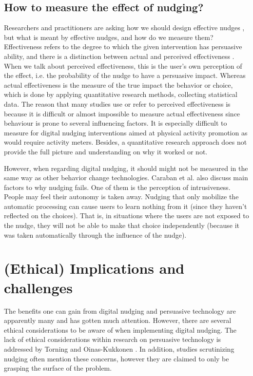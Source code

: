 \subsection{How to measure the effect of nudging?}
Researchers and practitioners are asking how we should design effective nudges 
\cite{purohit_functional_2019},
but what is meant by effective nudges, and how do we measure them? Effectiveness refers to the degree to which the given intervention has persuasive ability, and there is a distinction between actual and perceived effectiveness 
\cite{dillard_relationship_2007}.
When we talk about perceived effectiveness, this is the user's own perception of the effect, i.e. the probability of the nudge to have a persuasive impact. Whereas actual effectiveness is the measure of the true impact the behavior or choice, which is done by applying quantitative research methods, collecting statistical data. The reason that many studies use or refer to perceived effectiveness is because it is difficult or almost impossible to measure actual effectiveness since behaviour is prone to several influencing factors. It is especially difficult to measure for digital nudging interventions aimed at physical activity promotion as would require activity meters. Besides, a quantitative research approach does not provide the full picture and understanding on why it worked or not. 

However, when regarding digital nudging, it should might not be measured in the same way as other behavior change technologies. Caraban et al. also discuss main factors to why nudging fails. One of them is the perception of intrusiveness. People may feel their autonomy is taken away. Nudging that only mobilize the automatic processing can cause users to learn nothing from it (since they haven't reflected on the choices). That is, in situations where the users are not exposed to the nudge, they will not be able to make that choice independently (because it was taken automatically through the influence of the nudge). 

\section{(Ethical) Implications and challenges}
The benefits one can gain from digital nudging and persuasive technology are apparently many and has gotten much attention. However, there are several ethical considerations to be aware of when implementing digital nudging. The lack of ethical considerations within research on persuasive technology is addressed by Torning and Oinas-Kukkonen 
\cite{torning_pdf_2009}.
In addition, studies scrutinizing nudging often mention these concerns, however they are claimed to only be grasping the surface of the problem. 

